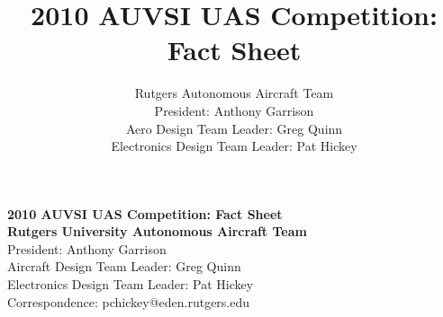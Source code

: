 \documentclass[10pt]{article}
\begin{document}
\title{2010 AUVSI UAS Competition: Fact Sheet}
\author{Rutgers Autonomous Aircraft Team
\\President: Anthony Garrison
\\Aero Design Team Leader: Greg Quinn
\\Electronics Design Team Leader: Pat Hickey}
\begin{center}
{\huge \bfseries 2010 AUVSI UAS Competition: Fact Sheet } \\[0.5cm]
{\large \bfseries Rutgers University Autonomous Aircraft Team } \\[0.5cm]
{President: Anthony Garrison \\ Aircraft Design Team Leader: Greg Quinn
\\Electronics Design Team Leader: Pat Hickey
\\Correspondence: pchickey@eden.rutgers.edu}\\
\end{center}
\end{document}
